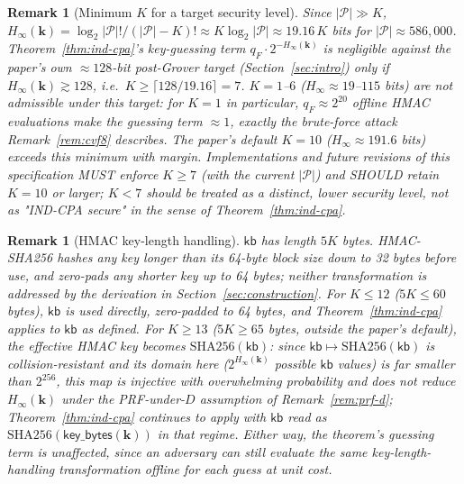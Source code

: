 \documentclass[11pt,a4paper]{article}
\newtheorem{remark}[theorem]{Remark}
\begin{document}
\begin{remark}[Minimum $K$ for a target security level]
\label{rem:min-K}
Since $|\mathcal{P}|\gg K$, $H_\infty(\mathbf{k}) = \log_2|\mathcal{P}|!/(|\mathcal{P}|-K)!
\approx K\log_2|\mathcal{P}| \approx 19.16\,K$ bits for $|\mathcal{P}|\approx
586{,}000$. Theorem~\ref{thm:ind-cpa}'s key-guessing term
$q_F\cdot 2^{-H_\infty(\mathbf{k})}$ is negligible against the paper's
own $\approx 128$-bit post-Grover target (Section~\ref{sec:intro}) only if
$H_\infty(\mathbf{k}) \gtrsim 128$, i.e.\ $K \geq \lceil 128/19.16\rceil = 7$.
$K=1$--$6$ ($H_\infty \approx 19$--$115$ bits) are \emph{not} admissible
under this target: for $K=1$ in particular, $q_F\approx 2^{20}$ offline
HMAC evaluations make the guessing term $\approx 1$, exactly the
brute-force attack Remark~\ref{rem:cvf8} describes. The paper's default
$K=10$ ($H_\infty\approx191.6$ bits) exceeds this minimum with margin.
Implementations and future revisions of this specification MUST enforce
$K\geq7$ (with the current $|\mathcal{P}|$) and SHOULD retain $K=10$ or
larger; $K<7$ should be treated as a distinct, lower security level, not
as "IND-CPA secure" in the sense of Theorem~\ref{thm:ind-cpa}.
\end{remark}

\begin{remark}[HMAC key-length handling]
\label{rem:hmac-keylen}
$\mathsf{kb}$ has length $5K$ bytes. HMAC-SHA256 hashes any key longer than
its 64-byte block size down to 32 bytes before use, and zero-pads any
shorter key up to 64 bytes; neither transformation is addressed by the
derivation in Section~\ref{sec:construction}. For $K\leq12$ ($5K\leq60$
bytes), $\mathsf{kb}$ is used directly, zero-padded to 64 bytes, and
Theorem~\ref{thm:ind-cpa} applies to $\mathsf{kb}$ as defined. For $K\geq13$
($5K\geq65$ bytes, outside the paper's default), the effective HMAC key
becomes $\mathrm{SHA256}(\mathsf{kb})$: since $\mathsf{kb}\mapsto
\mathrm{SHA256}(\mathsf{kb})$ is collision-resistant and its domain here
($2^{H_\infty(\mathbf{k})}$ possible $\mathsf{kb}$ values) is far smaller
than $2^{256}$, this map is injective with overwhelming probability and
does not reduce $H_\infty(\mathbf{k})$ under the PRF-under-$D$ assumption
of Remark~\ref{rem:prf-d}; Theorem~\ref{thm:ind-cpa} continues to apply
with $\mathsf{kb}$ read as $\mathrm{SHA256}(\mathsf{key\_bytes}(\mathbf{k}))$
in that regime. Either way, the theorem's guessing term is unaffected,
since an adversary can still evaluate the same key-length-handling
transformation offline for each guess at unit cost.
\end{remark}
\end{document}
